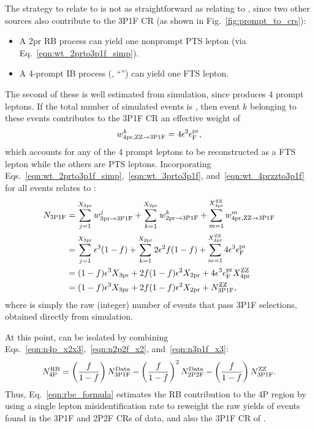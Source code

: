 The strategy to relate \xthreeprompt to \nthreePoneF is not as straightforward as relating \xtwoprompt to \ntwoPtwoF,
since two other sources also contribute to the 3P1F CR (as shown in Fig.~\ref{fig:prompt_to_crs}):
\begin{itemize}
	\item A 2pr RB process can yield one nonprompt PTS lepton (via Eq.~\ref{eqn:wt_2prto3p1f_simp}).
	\item A 4-prompt IB process (\qqggzzfourl, ``\ZZ'') can yield one FTS lepton.
\end{itemize}
The second of these is well estimated from simulation, since \ZZ produces 4 prompt leptons.
If the total number of simulated \ZZ events is \xfourpromptzz, then event $k$ belonging to these events contributes to the 3P1F CR an effective weight of
\begin{equation}
	\label{eqn:wt_4przzto3p1f}
	w_{\text{4pr},\text{Z}\text{Z} \to \text{3P1F}}^k = 4 \epsilon^3 \epsilon^\text{pr}_\text{F},
\end{equation}
which accounts for any of the 4 prompt leptons to be reconstructed as a FTS lepton while the others are PTS leptons.
Incorporating Eqs.~\ref{eqn:wt_2prto3p1f_simp},~\ref{eqn:wt_3prto3p1f}, and~\ref{eqn:wt_4przzto3p1f} for all events relates \xthreeprompt to \nthreePoneF:
\begin{align}
	\label{eqn:n3p1f_x3}
	N_{\text{3P1F}}
	&= \sum_{j=1}^{X_{3\text{pr}}} w_{\text{3pr} \to \text{3P1F}}^j + \sum_{k=1}^{X_{2\text{pr}}} w_{\text{2pr} \to \text{3P1F}}^k + \sum_{m=1}^{X_{4\text{pr}}^{\text{Z}\text{Z}}} w_{\text{4pr},\text{Z}\text{Z} \to \text{3P1F}}^m
	\notag
	\\
	&= \sum_{j=1}^{X_{3\text{pr}}} \epsilon^3 (1-f) + \sum_{k=1}^{X_{2\text{pr}}} 2 \epsilon^2 f (1-f) + \sum_{m=1}^{X_{4\text{pr}}^{\text{Z}\text{Z}}} 4 \epsilon^3 \epsilon^\text{pr}_\text{F}
	\notag
	\\
	&= (1-f) \epsilon^3 X_{3\text{pr}} + 2 f (1-f) \epsilon^2 X_{2\text{pr}} + 4 \epsilon^3 \epsilon^\text{pr}_\text{F} X_{4\text{pr}}^{\text{Z}\text{Z}}
	\notag
	\\
	&= (1-f) \epsilon^3 X_{3\text{pr}} + 2 f (1-f) \epsilon^2 X_{2\text{pr}} + N_{\text{3P1F}}^{\text{Z}\text{Z}},
\end{align}
where \nthreePoneFzz is simply the raw (integer) number of \ZZ events that pass 3P1F selections, obtained directly from simulation.

At this point, \nfourPRB can be isolated by combining Eqs.~\ref{eqn:n4p_x2x3},~\ref{eqn:n2p2f_x2}, and~\ref{eqn:n3p1f_x3}:
\begin{equation}
	\label{eqn:rbe_formula}
	N_\text{4P}^\text{RB} =
	\left( \frac{f}{1-f} \right) N_{\text{3P1F}}^{\text{Data}} -
	\left( \frac{f}{1-f} \right)^2 N_{\text{2P2F}}^{\text{Data}} - 
	\left( \frac{f}{1-f} \right) N_{\text{3P1F}}^{\text{Z}\text{Z}}.
\end{equation}
Thus, Eq.~\ref{eqn:rbe_formula} estimates the RB contribution to the 4P region by using a single lepton misidentification rate to reweight the raw yields of events found in the 3P1F and 2P2F CRs of data, and also the 3P1F CR of \ZZ.

